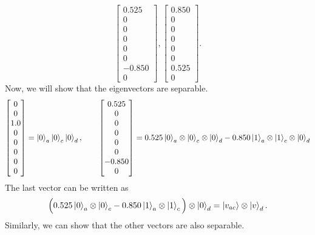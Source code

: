 \documentclass{scrartcl}
\begin{document}
\begin{equation*}
	\left[\begin{matrix}0.525\\0\\0\\0\\0\\0\\-0.850\\0\end{matrix}\right],
	\left[\begin{matrix}0.850\\0\\0\\0\\0\\0\\0.525\\0\end{matrix}\right].
\end{equation*} 
Now, we will show that the eigenvectors are separable. 
\begin{equation*}
	\begin{split}
	\left[\begin{matrix}0\\0\\1.0\\0\\0\\0\\0\\0\end{matrix}\right] = \ket{0}_a\ket{0}_c\ket{0}_d, \quad \quad \left[\begin{matrix}0.525\\0\\0\\0\\0\\0\\-0.850\\0\end{matrix}\right] = 0.525 \ket{0}_a \otimes \ket{0}_c \otimes \ket{0}_d - 0.850 \ket{1}_a \otimes \ket{1}_c \otimes \ket{0}_d	
	\end{split}
\end{equation*}
The last vector can be written as 
\begin{equation*}
	 \Big(0.525\ket{0}_a\otimes \ket{0}_c - 0.850\ket{1}_a\otimes \ket{1}_c\Big) \otimes \ket{0}_d = \ket{v_{ac}} \otimes \ket{v}_d.
\end{equation*}
Similarly, we can show that the other vectors are also separable.
\end{document}
